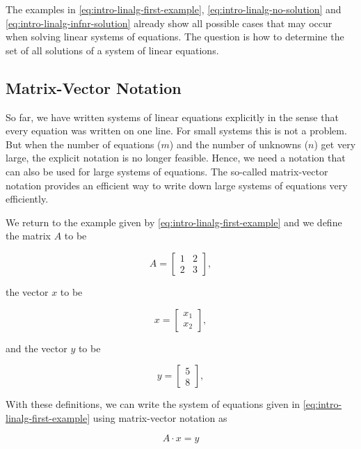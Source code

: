 \documentclass[
]{book}
\theoremstyle{definition}
\theoremstyle{definition}
\theoremstyle{definition}
\theoremstyle{remark}
\begin{document}
The examples in \eqref{eq:intro-linalg-first-example}, \eqref{eq:intro-linalg-no-solution} and \eqref{eq:intro-linalg-infnr-solution} already show all possible cases that may occur when solving linear systems of equations. The question is how to determine the set of all solutions of a system of linear equations.

\hypertarget{intro-linalg-matrix-vector-notation}{%
\subsection{Matrix-Vector Notation}\label{intro-linalg-matrix-vector-notation}}

So far, we have written systems of linear equations explicitly in the sense that every equation was written on one line. For small systems this is not a problem. But when the number of equations (\(m\)) and the number of unknowns (\(n\)) get very large, the explicit notation is no longer feasible. Hence, we need a notation that can also be used for large systems of equations. The so-called matrix-vector notation provides an efficient way to write down large systems of equations very efficiently.

We return to the example given by \eqref{eq:intro-linalg-first-example} and we define the matrix \(A\) to be

\[
A = \left[
\begin{array}{cc}
1  &  2 \\
2  &  3
\end{array}
\right], 
\]

the vector \(x\) to be

\[
x = \left[
\begin{array}{c}
x_1  \\
x_2  
\end{array}
\right], 
\]

and the vector \(y\) to be

\[
y = \left[
\begin{array}{c}
5  \\
8  
\end{array}
\right], 
\]

With these definitions, we can write the system of equations given in \eqref{eq:intro-linalg-first-example} using matrix-vector notation as

\begin{equation}
A \cdot x = y
\label{eq:intro-linalg-matrix-vector-notation}
\end{equation}
\end{document}
